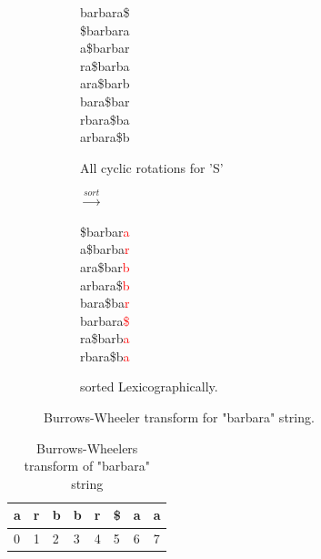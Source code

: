 \documentclass[11pt,a4paper]{report}
\begin{document}
\begin{figure}[H]
\centering
\begin{subfigure}{.5\textwidth}
  \centering
barbara\$\\
\$barbara\\
a\$barbar\\
ra\$barba\\
ara\$barb\\
bara\$bar\\
rbara\$ba\\
arbara\$b
  \caption{All cyclic rotations for 'S'}
  \label{fig:barbaraBWT1}
\end{subfigure}%
\begin{subfigure}{.1\textwidth}
  \centering
$\xrightarrow{sort}$
\label{fig:sub1}
\end{subfigure}%
\begin{subfigure}{.5\textwidth}
  \centering
\$barbar\textcolor{red}{a}\\
a\$barba\textcolor{red}{r}\\
ara\$bar\textcolor{red}{b}\\
arbara\$\textcolor{red}{b}\\
bara\$ba\textcolor{red}{r}\\
barbara\textcolor{red}{\$}\\
ra\$barb\textcolor{red}{a}\\
rbara\$b\textcolor{red}{a}
 \caption{sorted  Lexicographically.}
  \label{fig:Burrows-Wheeler transform}
\end{subfigure}
\caption{Burrows-Wheeler transform for "barbara" string.}
\label{barbaraBWT}
\end{figure}








\begin{table}[h]
 \centering
  \begin{tabular}{ | p{0.5cm} | p{0.5cm} | p{0.5cm} |p{0.5cm} |p{0.5cm} |p{0.5cm} |p{0.5cm} |p{0.5cm} |}
    \hline
  \textbf{a} & \textbf{r} &\textbf{b}  &\textbf{b} &\textbf{r} &\textbf{\$} &\textbf{a} &\textbf{a}\\ \hline
       0 & 1 &2&3&4&5&6&7 \\ \hline
      
   \end{tabular}
\caption{Burrows-Wheelers transform of "barbara" string}
\label{BWT-barbara}
\end{table}
\end{document}
